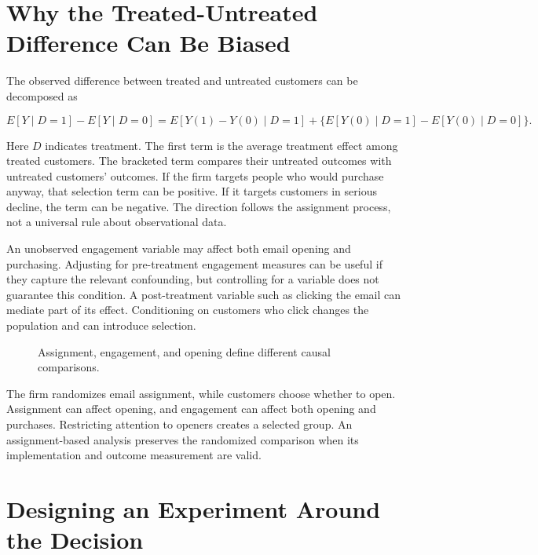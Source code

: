 \hypertarget{M06-why-the-treated-untreated-difference-can-be-biased}{%
\section{Why the Treated-Untreated Difference Can Be
Biased}\label{M06-why-the-treated-untreated-difference-can-be-biased}}

\noindent The observed difference between treated and untreated customers can be
decomposed as

\[
E[Y\mid D=1]-E[Y\mid D=0]
=E[Y(1)-Y(0)\mid D=1]
+\{E[Y(0)\mid D=1]-E[Y(0)\mid D=0]\}.
\]

Here \(D\) indicates treatment. The first term is the average treatment
effect among treated customers. The bracketed term compares their
untreated outcomes with untreated customers' outcomes. If the firm
targets people who would purchase anyway, that selection term can be
positive. If it targets customers in serious decline, the term can be
negative. The direction follows the assignment process, not a universal
rule about observational data.

An unobserved engagement variable may affect both email opening and
purchasing. Adjusting for pre-treatment engagement measures can be
useful if they capture the relevant confounding, but controlling for a
variable does not guarantee this condition. A post-treatment variable
such as clicking the email can mediate part of its effect. Conditioning
on customers who click changes the population and can introduce
selection.

\begin{figure}[htbp]
\centering

\caption{Assignment, engagement, and opening define different causal comparisons.}\label{fig:M06_dag}
\end{figure}

The firm randomizes email assignment, while customers choose whether to
open. Assignment can affect opening, and engagement can affect both
opening and purchases. Restricting attention to openers creates a
selected group. An assignment-based analysis preserves the randomized
comparison when its implementation and outcome measurement are valid.

\hypertarget{M06-designing-an-experiment-around-the-decision}{%
\section{Designing an Experiment Around the
Decision}\label{M06-designing-an-experiment-around-the-decision}}


